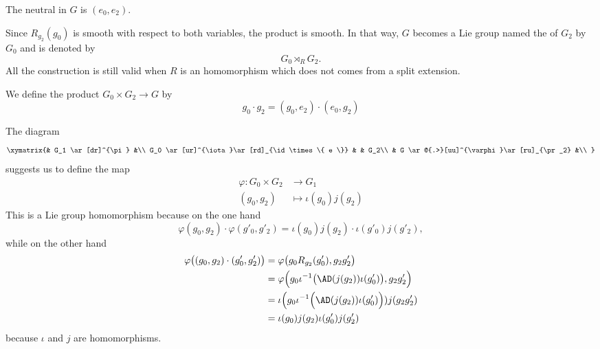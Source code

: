 The neutral in $G$ is $(e_0,e_2)$.

Since $R_{g_2}(g_0)$ is smooth with respect to both variables, the product is smooth. In that way, $G$ becomes a Lie group named the  of $G_2$ by $G_0$ and is denoted by
\begin{equation}
    G_0 \rtimes_RG_2.
\end{equation}
All the construction is still valid when $R$ is an homomorphism which does not comes from a split extension.

We define the product $G_0\times G_2\to G$ by
\begin{equation}
    g_0\cdot g_2=(g_0,e_2)\cdot(e_0,g_2)
\end{equation}

The diagram
\begin{equation}
    \xymatrix{%
            &       G_1 \ar[dr]^{\pi}           &\\
            G_0 \ar[ur]^{\iota}\ar[rd]_{\id\times\{ e \}}   &       & G_2\\
            &       G \ar@{.>}[uu]^{\varphi}\ar[ru]_{\pr_2}     &\\
       }
\end{equation}
suggests us to define the map
\begin{equation}
    \begin{aligned}
        \varphi\colon G_0\times G_2&\to G_1 \\
        (g_0,g_2)&\mapsto \iota(g_0)j(g_2) 
    \end{aligned}
\end{equation}
This is a Lie group homomorphism because on the one hand
\begin{equation}
    \varphi(g_0,g_2)\cdot \varphi(g'_0,g'_2)=\iota(g_0)j(g_2)\cdot \iota(g'_0)j(g'_2),
\end{equation}
while on the other hand
\begin{equation}
    \begin{aligned}[]
        \varphi\big( (g_0,g_2)\cdot (g'_0,g'_2) \big)&=\varphi\big( g_0R_{g_2}(g'_0),g_2g'_2 \big)\\
        &=\varphi\Big( g_0\iota^{-1}\big( \AD(j(g_2))\iota(g'_0) \big),g_2g'_2 \Big)\\
        &=\iota\Big(g_0\iota^{-1}\Big( \AD(j(g_2))\iota(g'_0) \Big))j(g_2g'_2)\\
        &=\iota(g_0)j(g_2)\iota(g'_0)j(g'_2)
    \end{aligned}
\end{equation}
because $\iota$ and $j$ are homomorphisms.

